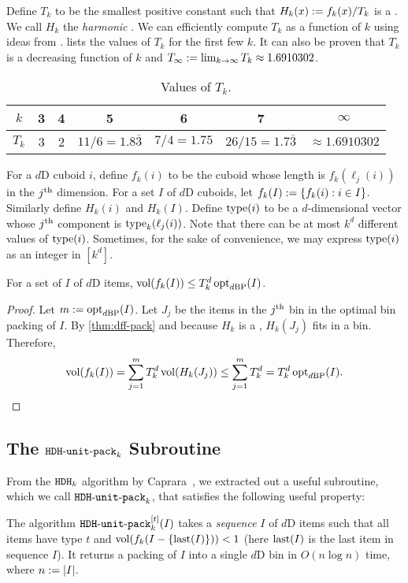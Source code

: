 Define $T_k$ to be the smallest positive constant such that
$H_k(x) := f_k(x)/T_k$ is a \dff{}. We call $H_k$ the \emph{harmonic \dff}.
We can efficiently compute $T_k$ as a function of $k$ using ideas from \cite{leelee,eku-harmonic}.
 lists the values of $T_k$ for the first few $k$.
It can also be proven that $T_k$ is a decreasing function of $k$
and $T_{\infty} := \lim_{k \to \infty} T_k \approx 1.6910302$.

\begin{table}[!ht]
\centering
\caption{Values of $T_k$.}
\begin{tabular}{|c|c|c|c|c|c|c|}
\hline
$k$ & 3 & 4 & 5 & 6 & 7 & $\infty$ \\
\hline
$T_k$ & 3 & 2 & $11/6 = 1.8\overline{3}$ & $7/4 = 1.75$
& $26/15 = 1.7\overline{3}$ & $\approx 1.6910302$ \\
\hline
\end{tabular}
\label{table:tk-values}
\end{table}

For a $d$D cuboid $i$, define $f_k(i)$ to be the cuboid
whose length is $f_k(\ell_j(i))$ in the $j^{\textrm{th}}$ dimension.
For a set $I$ of $d$D cuboids, let $f_k(I) := \{f_k(i): i \in I\}$.
Similarly define $H_k(i)$ and $H_k(I)$.
Define $\operatorname{type}(i)$ to be a $d$-dimensional vector whose $j^{\textrm{th}}$ component is $\operatorname{type}_k(\ell_j(i))$.
Note that there can be at most $k^d$ different values of $\operatorname{type}(i)$.
Sometimes, for the sake of convenience, we may express $\operatorname{type}(i)$ as an integer in $[k^d]$.

\begin{theorem}
\label{thm:fvol-bp}
For a set of $I$ of $d$D items, $\operatorname{vol}(f_k(I)) \le T_k^d \operatorname{opt}_{d\mathrm{BP}}(I)$.
\end{theorem}
\begin{proof}
Let $m := \operatorname{opt}_{d\mathrm{BP}}(I)$. Let $J_j$ be the items in the
$j^{\textrm{th}}$ bin in the optimal bin packing of $I$.
By \cref{thm:dff-pack} and because $H_k$ is a \dff{},
$H_k(J_j)$ fits in a bin. Therefore,
\[ \operatorname{vol}(f_k(I))
= \sum_{j=1}^m T_k^d \operatorname{vol}(H_k(J_j))
\le \sum_{j=1}^m T_k^d
= T_k^d \operatorname{opt}_{d\mathrm{BP}}(I).
\qedhere \]
\end{proof}

\subsection{The \texorpdfstring{$\operatorname{\mathtt{HDH-unit-pack}}_{k}$}{HDH-unit-pack} Subroutine}
\label{sec:hdhk-prelims:hdhkunit}

From the $\operatorname{\mathtt{HDH}}_{k}$ algorithm by Caprara~\cite{caprara2008},
we extracted out a useful subroutine, which we call $\operatorname{\mathtt{HDH-unit-pack}}_{k}$,
that satisfies the following useful property:
\begin{property}
\label{prop:hdhkunit}
The algorithm $\operatorname{\mathtt{HDH-unit-pack}}_{k}^{[t]}(I)$ takes a \emph{sequence} $I$ of $d$D items such that
all items have type $t$ and $\operatorname{vol}(f_k(I-\{\operatorname{last}(I)\})) < 1$
(here $\operatorname{last}(I)$ is the last item in sequence $I$).
It returns a packing of $I$ into a single $d$D bin
in $O(n\log n)$ time, where $n := |I|$.
\end{property}

